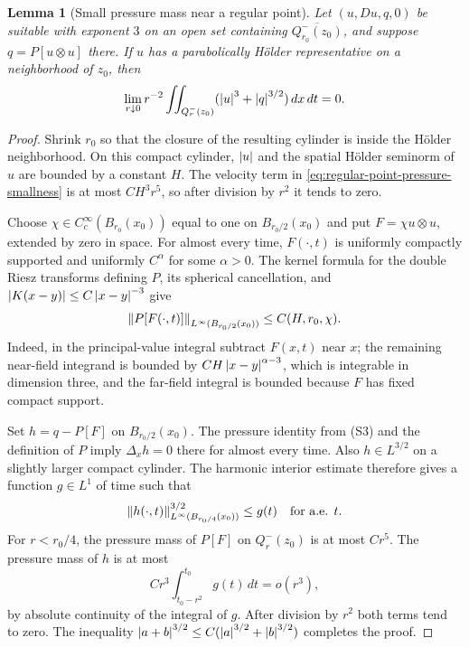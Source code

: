\documentclass[11pt,letterpaper]{article}
\numberwithin{equation}{section}
\theoremstyle{plain}
\newtheorem{lemma}[theorem]{Lemma}
\theoremstyle{definition}
\theoremstyle{remark}
\begin{document}
\begin{lemma}[Small pressure mass near a regular point]\label{lem:pressure-smallness-at-regular-point}
Let $(u,Du,q,0)$ be suitable with exponent $3$ on an open set containing
$\overline{Q_{r_0}^-(z_0)}$, and suppose $q=P[u\otimes u]$ there. If $u$ has
a parabolically H\"older representative on a neighborhood of $z_0$, then
\begin{equation}\label{eq:regular-point-pressure-smallness}
 \lim_{r\downarrow0}r^{-2}\iint_{Q_r^-(z_0)}
       (\left\lvert u\right\rvert^3+\left\lvert q\right\rvert^{3/2})\,dx\,dt=0.
\end{equation}
\end{lemma}

\begin{proof}
Shrink $r_0$ so that the closure of the resulting cylinder is inside the
H\"older neighborhood. On this compact cylinder, $\left\lvert u\right\rvert$ and the spatial
H\"older seminorm of $u$ are bounded by a constant $H$. The velocity term
in \eqref{eq:regular-point-pressure-smallness} is at most
$C H^3r^5$, so after division by $r^2$ it tends to zero.

Choose $\chi\in C_c^\infty(B_{r_0}(x_0))$ equal to one on
$B_{r_0/2}(x_0)$ and put
$F=\chi u\otimes u$, extended by zero in space. For almost every time,
$F(\cdot,t)$ is uniformly compactly supported and uniformly
$C^\alpha$ for some $\alpha>0$. The kernel formula for the double Riesz
transforms defining $P$, its spherical cancellation, and
$\left\lvert K(x-y)\right\rvert\le C\left\lvert x-y\right\rvert^{-3}$ give
\[
 \left\lVert P[F(\cdot,t)]\right\rVert_{L^\infty(B_{r_0/2}(x_0))}\le C(H,r_0,\chi).
\]
Indeed, in the principal-value integral subtract $F(x,t)$ near $x$; the
remaining near-field integrand is bounded by
$C H\left\lvert x-y\right\rvert^{\alpha-3}$, which is integrable in dimension three, and the
far-field integral is bounded because $F$ has fixed compact support.

Set $h=q-P[F]$ on $B_{r_0/2}(x_0)$. The pressure identity from (S3) and the
definition of $P$ imply $\Delta_x h=0$ there for almost every time. Also
$h\in L^{3/2}$ on a slightly larger compact cylinder. The harmonic interior
estimate therefore gives a function $g\in L^1$ of time such that
\[
 \left\lVert h(\cdot,t)\right\rVert_{L^\infty(B_{r_0/4}(x_0))}^{3/2}\le g(t)
 \quad\text{for a.e. }t.
\]
For $r<r_0/4$, the pressure mass of $P[F]$ on $Q_r^-(z_0)$ is at most
$C r^5$. The pressure mass of $h$ is at most
\[
 C r^3\int_{t_0-r^2}^{t_0}g(t)\,dt=o(r^3),
\]
by absolute continuity of the integral of $g$. After division by $r^2$ both
terms tend to zero. The inequality
$\left\lvert a+b\right\rvert^{3/2}\le C(\left\lvert a\right\rvert^{3/2}+\left\lvert b\right\rvert^{3/2})$ completes the proof.
\end{proof}
\end{document}
